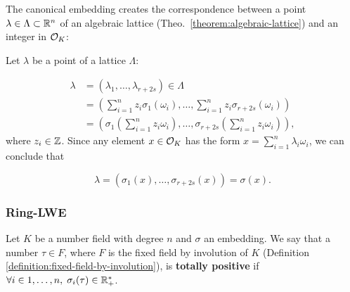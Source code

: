 \documentclass[a4paper,12pt]{article}
\begin{document}
\begin{remark}\label{remmark:lattices-number-field-correspondence}
  The canonical embedding creates the correspondence between a point $\lambda \in \Lambda \subset
  \mathbb{R}^n$ of an algebraic lattice (Theo.~\ref{theorem:algebraic-lattice}) and an integer in $\mathcal{O}_K$:

  Let $\lambda$ be a point of a lattice $\Lambda$:

  \begin{align*} 
    \lambda &= (\lambda_1,\dots,\lambda_{r+2s}) \in \Lambda \\
      &= \left( \sum_{i=1}^n{z_i\sigma_1(\omega_i)} , \dots , \sum_{i=1}^n{z_i\sigma_{r+2s}(\omega_i)} \right) \\
      &= \left( \sigma_1\left(   \sum_{i=1}^n{z_i\omega_i} \right) , \dots , \sigma_{r+2s} \left( \sum_{i=1}^n{z_i\omega_i}  \right) \right), 
  \end{align*}
  where $z_i \in \mathbb{Z}$. Since any element $x \in \mathcal{O}_K$ has the form $x =
  \sum_{i=1}^n{\lambda_i\omega_i}$, we can conclude that

  \begin{equation*}
    \lambda = \left( \sigma_1(x), \dots, \sigma_{r+2s}(x) \right) = \sigma(x).
  \end{equation*}

\end{remark}
\subsubsection{Ring-LWE}
\label{sec:orga0d8d8e}

    \begin{definition}
  Let $K$ be a number field with degree $n$ and $\sigma$ an embedding. We say that a
  number $\tau \in F$, where $F$ is the fixed field by involution of $K$ (Definition \ref{definition:fixed-field-by-involution}), is \textbf{totally  positive} if $\forall i \in {1, \dots , n}, \; \sigma_i(\tau) \in \mathbb{R}^*_+$. 
\end{definition}
\end{document}
